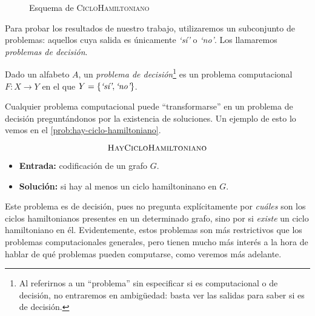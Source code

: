 \begin{figure}[H]
\centering
\vspace*{8pt}

\caption{Esquema de \textsc{CicloHamiltoniano}}
\label{fig:esquema-ciclohamiltoniano}
\end{figure}

Para probar los resultados de nuestro trabajo, utilizaremos un subconjunto de problemas: aquellos cuya salida es únicamente \emph{`sí'} o \emph{`no'}. Los llamaremos \emph{problemas de decisión}.

\begin{definicion}\label{def:problema-decision}
Dado un alfabeto $A$, un \emph{problema de decisión}\footnote{Al referirnos a un ``problema'' sin especificar si es computacional o de decisión, no entraremos en ambigüedad: basta ver las salidas para saber si es de decisión.} es un problema computacional $F:X\longrightarrow Y$ en el que $Y = \{\emph{`sí'}, \emph{`no'}\}$.
\end{definicion}

Cualquier problema computacional puede ``transformarse'' en un problema de decisión preguntándonos por la existencia de soluciones. Un ejemplo de esto lo vemos en el \cref{prob:hay-ciclo-hamiltoniano}.

\vspace{8pt}
\begin{problema}
\begin{framed}
$$\text{\textsc{HayCicloHamiltoniano}}$$

\begin{itemize}
    \item \textbf{Entrada:} codificación de un grafo $G$.
    \item \textbf{Solución:} si hay al menos un ciclo hamiltoninano en $G$.
\end{itemize}
\end{framed}
\caption{\textsc{HayCicloHamiltoniano}}
\label{prob:hay-ciclo-hamiltoniano}
\end{problema}

Este problema es de decisión, pues no pregunta explícitamente por \emph{cuáles} son los ciclos hamiltonianos presentes en un determinado grafo, sino por si \emph{existe} un ciclo hamiltoniano en él. Evidentemente, estos problemas son más restrictivos que los problemas computacionales generales, pero tienen mucho más interés a la hora de hablar de qué problemas pueden computarse, como veremos más adelante.

